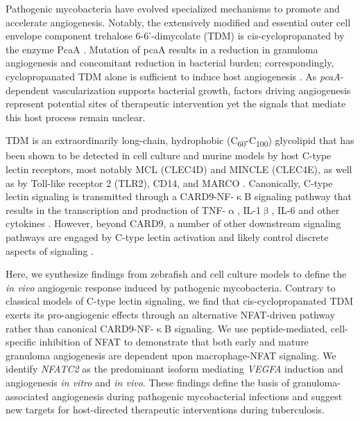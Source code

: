 Pathogenic mycobacteria have evolved specialized mechanisms to promote and accelerate angiogenesis. Notably, the extensively modified and essential outer cell envelope component trehalose 6-6'-dimycolate (TDM) is cis-cyclopropanated by the enzyme PcaA \citep{Glickman2000, Rao2005}. Mutation of pcaA results in a reduction in granuloma angiogenesis and concomitant reduction in bacterial burden; correspondingly, cyclopropanated TDM alone is sufficient to induce host angiogenesis \citep{Saita2000, Sakaguchi2000, Walton2018}. As \textit{pcaA}-dependent vascularization supports bacterial growth, factors driving angiogenesis represent potential sites of therapeutic intervention yet the signals that mediate this host process remain unclear.

TDM is an extraordinarily long-chain, hydrophobic (C\textsubscript{60}-C\textsubscript{100}) glycolipid \citep{Noll1956a, Noll1956b, Hunter2006a, Behling1993} that has been shown to be detected in cell culture and murine models by host C-type lectin receptors, most notably MCL (CLEC4D) and MINCLE (CLEC4E), as well as by Toll-like receptor 2 (TLR2), CD14, and MARCO \citep{Bowdish2009, Matsunaga2009, Miyake2013, Ishikawa2009}. Canonically, C-type lectin signaling is transmitted through a CARD9-NF-$\upkappa$B signaling pathway that results in the transcription and production of TNF-$\upalpha$, IL-1$\upbeta$, IL-6 and other cytokines \citep{Yamasaki2008, Goodridge2009, LobatoPascual2013, Zhao2014, Deerhake2021}. However, beyond CARD9, a number of other downstream signaling pathways are engaged by C-type lectin activation and likely control discrete aspects of signaling \citep{Goodridge2007, Deerhake2021}.

Here, we synthesize findings from zebrafish and cell culture models to define the \textit{in vivo} angiogenic response induced by pathogenic mycobacteria. Contrary to classical models of C-type lectin signaling, we find that cis-cyclopropanated TDM exerts its pro-angiogenic effects through an alternative NFAT-driven pathway rather than canonical CARD9-NF-$\upkappa$B signaling. We use peptide-mediated, cell-specific inhibition of NFAT to demonstrate that both early and mature granuloma angiogenesis are dependent upon macrophage-NFAT signaling. We identify \textit{NFATC2} as the predominant isoform mediating \textit{VEGFA} induction and angiogenesis \textit{in vitro} and \textit{in vivo}. These findings define the basis of granuloma-associated angiogenesis during pathogenic mycobacterial infections and suggest new targets for host-directed therapeutic interventions during tuberculosis.

